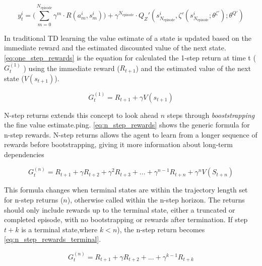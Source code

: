 \begin{equation}
    y^i_t = \bigg(\sum_{m=0}^{N_{\text{episode}}} \gamma^m \cdot R(a^i_m, s^i_m)\bigg) + \gamma^{N_{\text{episode}}} \cdot Q_Z'(s^i_{N_{\text{episode}}}, \zeta'(s^i_{N_{\text{episode}}}; \theta^{\zeta'}); \theta^{Q'})
\label{eq:N_step_rewards}
\end{equation}

\begin{tcolorbox}[title={\textbf{Lemma. N-step returns}}]
In traditional TD learning the value estimate of a state is updated based on the immediate reward and the estimated discounted value of the next state. \autoref{eq:one_step_rewards} is the equation for calculated the 1-step return at time t ($G_t^{(1)}$ ) using the immediate reward ($R_{t+1}$) and the estimated value of the next state ($V(s_{t+1})$).


\begin{equation}
    G_t^{(1)} = R_{t+1} + \gamma V(s_{t+1})
\label{eq:one_step_rewards}
\end{equation}

N-step returns extends this concept to look ahead $n$ steps through \textit{booststrapping} the fine value estimate.ping. \autoref{eq:n_step_rewards} shows the generic formula for n-step rewards. N-step returns allows the agent to learn from a longer sequence of rewards before bootstrapping, giving it more information about long-term dependencies

\begin{equation}
    G_t^{(n)} = R_{t+1} + \gamma R_{t+2} + \gamma^2 R_{t+3} + ... + \gamma^{n-1} R_{t+n} + \gamma^n V(S_{t+n})
\label{eq:n_step_rewards}
\end{equation}

This formula changes when terminal states are within the trajectory length set for n-step returns ($n$), otherwise called within the n-step horizon. The returns should only include rewards up to the terminal state, either a truncated or completed episode, with no bootstrapping or rewards after termination. If step $t+k$ is a terminal state,where $k < n$), the n-step return becomes \autoref{eq:n_step_rewards_terminal}.

\begin{equation}
    G_t^{(n)} = R_{t+1} + \gamma R_{t+2} + ... + \gamma^{k-1} R_{t+k}
\label{eq:n_step_rewards_terminal}
\end{equation}
\end{tcolorbox}


